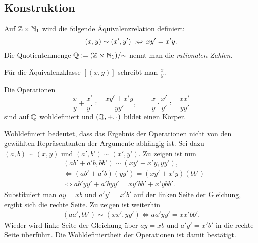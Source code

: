 \subsection{Konstruktion}

\begin{Definition}\newlinefirst
Auf $\mathbb Z\times\mathbb N_1$ wird die folgende Äquivalenzrelation definiert:
\[(x,y)\sim (x',y')\,:\Leftrightarrow\, xy' = x'y.\]
Die Quotientenmenge $\mathbb Q := (\mathbb Z\times\mathbb N_1)/{\sim}$ nennt man
die \emph{rationalen Zahlen}.
\end{Definition}
Für die Äquivalenzklasse $[(x,y)]$ schreibt man $\frac{x}{y}$.

\begin{Satz}\newlinefirst
Die Operationen
\[\frac{x}{y}+\frac{x'}{y'} := \frac{xy'+x'y}{yy'},
\qquad\frac{x}{y}\cdot \frac{x'}{y'} := \frac{xx'}{yy'}\]
sind auf $\mathbb Q$ wohldefiniert und $(\mathbb Q,+,\cdot)$ bildet einen Körper.
\end{Satz}
 Wohldefiniert bedeutet, dass das Ergebnis der
Operationen nicht von den gewählten Repräsentanten der Argumente
abhängig ist. Sei dazu $(a,b)\sim (x,y)$ und
$(a',b')\sim (x',y')$. Zu zeigen ist nun
\begin{align*}
&(ab'+a'b,bb')\sim (xy'+x'y,yy'),\\
&\iff (ab'+a'b)(yy') = (xy'+x'y)(bb')\\
&\iff ab' yy' + a'byy' = xy'bb'+x'ybb'.
\end{align*}
Substituiert man $ay=xb$ und $a'y'=x'b'$ auf
der linken Seite der Gleichung, ergibt sich die rechte Seite.
Zu zeigen ist weiterhin
\begin{align*}
(aa',bb')\sim (xx',yy')
\iff aa'yy' = xx'bb'.
\end{align*}
Wieder wird linke Seite der Gleichung über $ay=xb$
und $a'y'=x'b'$ in die rechte Seite überführt.
Die Wohldefiniertheit der Operationen ist damit bestätigt.

